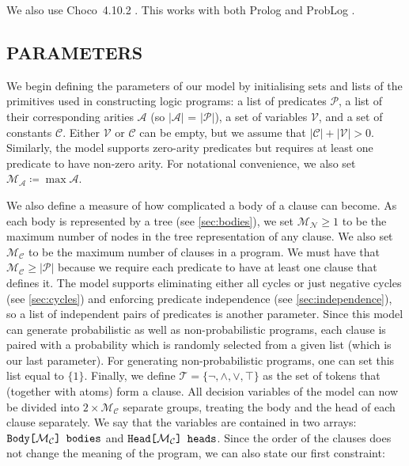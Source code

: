 \documentclass[letterpaper]{article}
\theoremstyle{definition}
\newcommand{\variable}[1]{\texttt{\textup{#1}}}
\newcommand{\arrayt}[3]{\variable{{#3}[}{#2}\variable{] {#1}}}
\newcommand{\predicates}{\mathcal{P}}
\newcommand{\variables}{\mathcal{V}}
\newcommand{\constants}{\mathcal{C}}
\newcommand{\tokens}{\mathcal{T}}
\newcommand{\arities}{\mathcal{A}}
\newcommand{\maxArity}{\mathcal{M}_{\mathcal{A}}}
\newcommand{\maxNumNodes}{\mathcal{M}_{\mathcal{N}}}
\newcommand{\maxNumClauses}{\mathcal{M}_{\mathcal{C}}}
\begin{document}
We also use Choco~4.10.2 \citep{choco}. This works with both Prolog
\citep{DBLP:books/daglib/0041598} and ProbLog \citep{DBLP:conf/ijcai/RaedtKT07}.

\subsection{PARAMETERS}

We begin defining the parameters of our model by initialising sets and lists
of the primitives used in constructing logic programs: a list of predicates
$\predicates{}$, a list of their corresponding arities $\arities{}$ (so
$|\arities{}|$ = $|\predicates{}|$), a set of variables $\variables{}$, and a
set of constants $\constants{}$. Either $\variables{}$ or $\constants{}$ can be
empty, but we assume that $|\constants{}| + |\variables{}| > 0$. Similarly, the
model supports zero-arity predicates but requires at least one predicate to have
non-zero arity. For notational convenience, we also set $\maxArity{} \coloneqq
\max \arities{}$.

We also define a measure of how complicated a body of a clause can become. As
each body is represented by a tree (see \cref{sec:bodies}), we set
$\maxNumNodes{} \ge 1$ to be the maximum number of nodes in the tree
representation of any clause. We also set $\maxNumClauses{}$ to be the maximum
number of clauses in a program. We must have that $\maxNumClauses{} \ge
|\predicates{}|$ because we require each predicate to have at least one clause
that defines it. The model supports eliminating either all cycles or just
negative cycles (see \cref{sec:cycles}) and enforcing predicate independence
(see \cref{sec:independence}), so a list of independent pairs of predicates is
another parameter. Since this model can generate probabilistic as well as
non-probabilistic programs, each clause is paired with a probability which is
randomly selected from a given list (which is our last parameter). For
generating non-probabilistic programs, one can set this list equal to $\{ 1 \}$.
Finally, we define $\tokens{} = \{ \neg, \land, \lor, \top \}$ as the set of
tokens that (together with atoms) form a clause. All decision variables of the
model can now be divided into $2 \times \maxNumClauses{}$ separate groups,
treating the body and the head of each clause separately. We say that the
variables are contained in two arrays: $\arrayt{bodies}{\maxNumClauses{}}{Body}$
and $\arrayt{heads}{\maxNumClauses{}}{Head}$. Since the order of the clauses
does not change the meaning of the program, we can also state our first
constraint:
\end{document}
